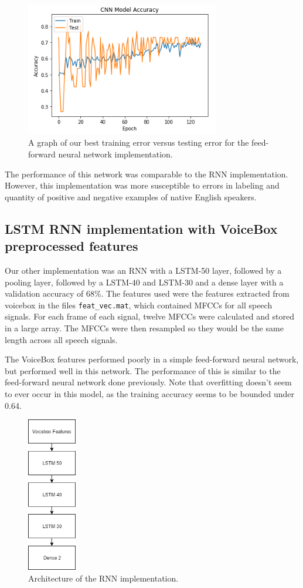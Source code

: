 \documentclass{article}
\begin{document}
\begin{figure}[htb]
	\centering
	\includegraphics[width = 8.5cm]{figs/best_ff_acc}
	\caption{A graph of our best training error versus testing error for the feed-forward neural network implementation.}
	\label{fig:best_ff}
\end{figure}

The performance of this network was comparable to the RNN implementation.
However, this implementation was more susceptible to errors in labeling and quantity of positive and negative examples of native English speakers.

\subsection{LSTM RNN implementation with VoiceBox preprocessed features}
\label{subsec:rnn}

Our other implementation was an RNN with a LSTM-50 layer, followed by a pooling layer, followed by a LSTM-40 and LSTM-30 and a dense layer with a validation accuracy of 68\%.
The features used were the features extracted from voicebox in the files \texttt{feat\_vec.mat}, which contained MFCCs for all speech signals.
For each frame of each signal, twelve MFCCs were calculated and stored in a large array.
The MFCCs were then resampled so they would be the same length across all speech signals.

The VoiceBox features performed poorly in a simple feed-forward neural network, but performed well in this network.
The performance of this is similar to the feed-forward neural network done previously.
Note that overfitting doesn’t seem to ever occur in this model, as the training accuracy seems to be bounded under 0.64.

\begin{figure}[htb]
	\centering
	\includegraphics[width = 2.15cm]{figs/rnn_architecture}
	\caption{Architecture of the RNN implementation.}
	\label{fig:rnn_architecture}
\end{figure}
\end{document}
